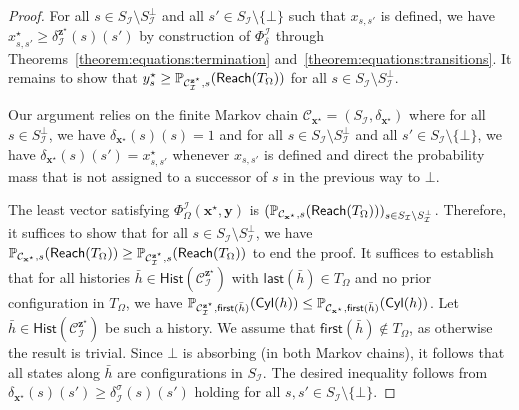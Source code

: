 \documentclass[a4paper,UKenglish,cleveref,autoref,thm-restate,colorlinks]{lipics-v2021}
\newcommand{\cyl}[1]{\mathsf{Cyl}(#1)}
\newcommand{\mdpStateSpace}{S}
\newcommand{\mdpTrans}{\delta}
\newcommand{\histSet}[1]{\mathsf{Hist}(#1)}
\newcommand{\hist}{h}
\newcommand{\last}[1]{\mathsf{last}(#1)}
\newcommand{\first}[1]{\mathsf{first}(#1)}
\newcommand{\ocConfig}{s}
\newcommand{\ocTrans}{\delta}
\newcommand{\mchain}{\mathcal{C}}
\newcommand{\intPart}{\mathcal{I}}
\newcommand{\compressChainStrat}[1]{\mchain^{#1}_{\intPart}}
\newcommand{\compressChainStateSpace}{\mdpStateSpace_{\intPart}}
\newcommand{\compressChainStateSpaceStar}{\mdpStateSpace_{\intPart}^{\bot}}
\newcommand{\compressChainTransTemplate}[2]{\mdpTrans^{#1}_{#2}}
\newcommand{\compressChainTrans}{\compressChainTransTemplate{\strat}{\intPart}}
\newcommand{\mcHist}{\bar{\hist}}
\newcommand{\varTrans}{x}
\newcommand{\solTrans}{\varTrans^\star}
\newcommand{\solTransTuple}{\mathbf{\varTrans}^{\star}}
\newcommand{\varObj}{y}
\newcommand{\varObjTuple}{\mathbf{\varObj}}
\newcommand{\solObj}{\varObj^{\star}}
\newcommand{\varStrat}{z}
\newcommand{\solStratTuple}{\mathbf{\varStrat}^{\star}}
\newcommand{\compressChainSymSol}{\compressChainStrat{\solStratTuple}}
\newcommand{\compressChainTransSymSol}{\compressChainTransTemplate{\solStratTuple}{\intPart}}
\newcommand{\formulaTransBase}{\Phi_{\ocTrans}}
\newcommand{\formulaObjBase}{\Phi_{\objective}}
\newcommand{\formulaTrans}{\formulaTransBase^\intPart}
\newcommand{\formulaObj}{\formulaObjBase^\intPart}
\newcommand{\objective}{\Omega}
\newcommand{\reach}[1]{\mathsf{Reach}(#1)}
\newcommand{\target}{T}
\newcommand{\stratGeneric}[1]{{\sigma_{#1}}}
\newcommand{\strat}{\stratGeneric{}}
\begin{document}
\begin{proof}
  For all $\ocConfig\in\compressChainStateSpace\setminus\compressChainStateSpaceStar$ and all $\ocConfig'\in\compressChainStateSpace\setminus\{\bot\}$ such that $\varTrans_{\ocConfig, \ocConfig'}$ is defined, we have $\solTrans_{\ocConfig, \ocConfig'}\geq\compressChainTransSymSol(\ocConfig)(\ocConfig')$ by construction of $\formulaTrans$ through Theorems~\ref{theorem:equations:termination} and~\ref{theorem:equations:transitions}.
  It remains to show that $\solObj_{\ocConfig}\geq\probaMCverb{\compressChainSymSol}{\ocConfig}(\reach{\target_\objective})$ for all $\ocConfig\in\compressChainStateSpace\setminus\compressChainStateSpaceStar$.

  Our argument relies on the finite Markov chain $\mchain_{\solTransTuple} = (\compressChainStateSpace, \mdpTrans_{\solTransTuple})$ where for all $\ocConfig\in\compressChainStateSpaceStar$, we have $\mdpTrans_{\solTransTuple}(\ocConfig)(\ocConfig)=1$ and for all $\ocConfig\in\compressChainStateSpace\setminus\compressChainStateSpaceStar$ and all $\ocConfig'\in\compressChainStateSpace\setminus\{\bot\}$, we have $\mdpTrans_{\solTransTuple}(\ocConfig)(\ocConfig')=\solTrans_{\ocConfig, \ocConfig'}$ whenever $\varTrans_{\ocConfig, \ocConfig'}$ is defined and direct the probability mass that is not assigned to a successor of $\ocConfig$ in the previous way to $\bot$.

  The least vector satisfying $\formulaObj(\solTransTuple, \varObjTuple)$ is $(\probaMCverb{\mchain_{\solTransTuple}}{\ocConfig}(\reach{\target_\objective}))_{\ocConfig\in\compressChainStateSpace\setminus\compressChainStateSpaceStar}$.
  Therefore, it suffices to show that for all $\ocConfig\in\compressChainStateSpace\setminus\compressChainStateSpaceStar$, we have $\probaMCverb{\mchain_{\solTransTuple}}{\ocConfig}(\reach{\target_\objective})\geq\probaMCverb{\compressChainSymSol}{\ocConfig}(\reach{\target_\objective})$ to end the proof.
  It suffices to establish that for all histories $\mcHist\in\histSet{\compressChainSymSol}$ with $\last{\mcHist}\in\target_\objective$ and no prior configuration in $\target_\objective$, we have $\probaMCverb{\compressChainSymSol}{\first{\mcHist}}(\cyl{\hist})\leq\probaMCverb{\mchain_{\solTransTuple}}{\first{\mcHist}}(\cyl{\hist})$.
  Let $\mcHist\in\histSet{\compressChainSymSol}$ be such a history.
  We assume that $\first{\mcHist}\notin\target_\objective$, as otherwise the result is trivial.
  Since $\bot$ is absorbing (in both Markov chains), it follows that all states along $\mcHist$ are configurations in $\compressChainStateSpace$.
  The desired inequality follows from $\ocTrans_{\solTransTuple}(\ocConfig)(\ocConfig')\geq\compressChainTrans(\ocConfig)(\ocConfig')$ holding for all $\ocConfig, \ocConfig'\in\compressChainStateSpace\setminus\{\bot\}$. \end{proof}
\end{document}
